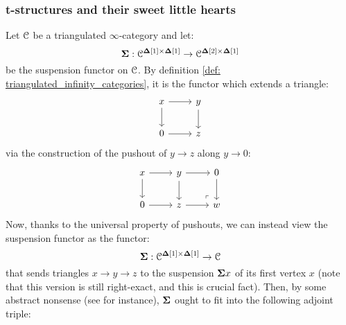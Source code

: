             \subsubsection{t-structures and their sweet little hearts}
                \begin{remark} \label{remark: suspensions_and_loops}
                    Let $\mathcal{C}$ be a triangulated $\infty$-category and let:
                        $$\suspension: \C^{\simp[1] \x \simp[1]} \to \C^{\simp[2] \x \simp[1]}$$
                    be the suspension functor on $\mathcal{C}$. By definition \ref{def: triangulated_infinity_categories}, it is the functor which extends a triangle:
                        $$
                            \begin{tikzcd}
                            	x & y \\
                            	0 & z
                            	\arrow[from=1-1, to=2-1]
                            	\arrow[from=1-1, to=1-2]
                            	\arrow[from=1-2, to=2-2]
                            	\arrow[from=2-1, to=2-2]
                            \end{tikzcd}
                        $$
                    via the construction of the pushout of $y \to z$ along $y \to 0$:
                        $$
                            \begin{tikzcd}
                            	x & y & 0 \\
                            	0 & z & w
                            	\arrow[from=1-1, to=2-1]
                            	\arrow[from=1-1, to=1-2]
                            	\arrow[from=1-2, to=2-2]
                            	\arrow[from=2-1, to=2-2]
                            	\arrow[from=1-2, to=1-3]
                            	\arrow[from=1-3, to=2-3]
                            	\arrow[from=2-2, to=2-3]
                            	\arrow["\lrcorner"{anchor=center, pos=0.125, rotate=180}, draw=none, from=2-3, to=1-2]
                            \end{tikzcd}
                        $$
                    Now, thanks to the universal property of pushouts, we can instead view the suspension functor as the functor:
                        $$\suspension: \C^{\simp[1] \x \simp[1]} \to \C$$
                    that sends triangles $x \to y \to z$ to the suspension $\mathbf{\Sigma} x$ of its first vertex $x$ (note that this version is still right-exact, and this is crucial fact). Then, by some abstract nonsense (see \cite[Section 3]{nlab:infinity-1-limit} for instance), $\mathbf{\Sigma}$ ought to fit into the following adjoint triple:

\end{remark}
